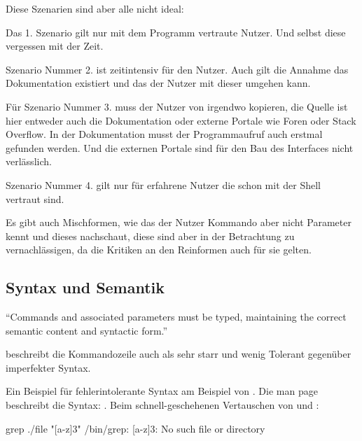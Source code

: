 \documentclass[oneside,bibliography=totocnumbered,BCOR=5mm]{scrbook}
\newenvironment{code}{\captionsetup{type=listing, skip=0pt}}{}
\begin{document}
Diese Szenarien sind aber alle nicht ideal:

\medskip

Das 1. Szenario gilt nur mit dem Programm vertraute Nutzer. Und selbst diese
vergessen mit der Zeit. %

\medskip

Szenario Nummer 2. ist zeitintensiv für den Nutzer. Auch gilt die Annahme das
Dokumentation existiert und das der Nutzer mit dieser umgehen kann.

\medskip

Für Szenario Nummer 3. muss der Nutzer von irgendwo kopieren, die Quelle ist
hier entweder auch die Dokumentation oder externe Portale wie Foren oder
Stack Overflow. In der Dokumentation musst der Programmaufruf auch erstmal
gefunden werden. Und die externen Portale sind für den Bau des Interfaces nicht
verlässlich.

\medskip

Szenario Nummer 4. gilt nur für erfahrene Nutzer die schon mit der Shell
vertraut sind.

\medskip

Es gibt auch Mischformen, wie das der Nutzer Kommando aber nicht Parameter kennt
und dieses nachschaut, diese sind aber in der Betrachtung zu vernachlässigen, da
die Kritiken an den Reinformen auch für sie gelten.

\subsection{Syntax und Semantik}

``Commands and associated parameters must be typed, maintaining the correct
semantic content and syntactic form.'' \parencite[184]{Westerman_1997}

\cite{Gentner_1996} beschreibt die Kommandozeile auch als sehr starr und wenig
Tolerant gegenüber imperfekter Syntax.


\bigskip

Ein Beispiel für fehlerintolerante Syntax am Beispiel von .
Die man page beschreibt die Syntax: .
Beim schnell-geschehenen Vertauschen von  und :

\begin{code}
  \begin{shellcode}
grep ./file "[a-z]{3}"
/bin/grep: [a-z]{3}: No such file or directory
  \end{shellcode}
  \medskip
\end{code}
\end{document}
